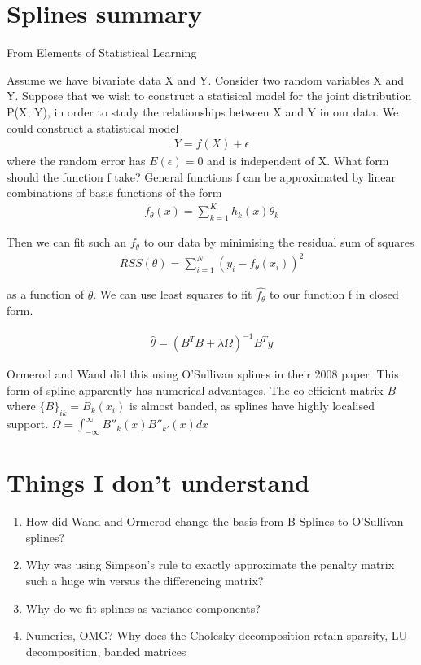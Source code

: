 \documentclass{amsart}
\begin{document}
\section{Splines summary}
From Elements of Statistical Learning

Assume we have bivariate data X and Y. Consider two random variables X and Y.
Suppose that we wish to construct a statisical model for the joint distribution 
P(X, Y), in order to study the relationships between X and Y in our data. We
could construct a statistical model
\begin{align*}
	Y = f(X) + \epsilon	
\end{align*}
where the random error has $E(\epsilon) = 0$ and is independent of X. What form
should the function f take? General functions f can be approximated by linear
combinations of basis functions of the form
\begin{align*}
	f_\theta(x) = \sum_{k=1}^K h_k(x) \theta_k
\end{align*}

Then we can fit such an $f_\theta$ to our data by minimising the residual
sum of squares
\begin{align*}
	RSS(\theta) = \sum_{i=1}^N (y_i - f_\theta(x_i))^2
\end{align*}

as a function of $\theta$. We can use least squares %
to fit $\hat{f_{\theta}}$ to our function f in closed form.

\begin{align*}
	\hat{\theta} = (B^TB + \lambda \Omega)^{-1}B^T y
\end{align*}

Ormerod and Wand did this using O'Sullivan splines in their 2008 paper. This
form of spline apparently has numerical advantages. The co-efficient matrix
$B$ where $\{B\}_{ik} = B_{k}(x_i)$ is
almost banded, as splines have highly localised support.
$\Omega = \int_{-\infty}^{\infty} B''_{k}(x) B''_{k'}(x) dx$

\section{Things I don't understand}
\begin{enumerate}
	\item How did Wand and Ormerod change the basis from B Splines to O'Sullivan
	splines?
	\item Why was using Simpson's rule to exactly approximate the penalty matrix
	such a huge win versus the differencing matrix?
	\item Why do we fit splines as variance components?
	\item Numerics, OMG? Why does the Cholesky decomposition retain sparsity,
	LU decomposition, banded matrices
\end{enumerate}
\end{document}
